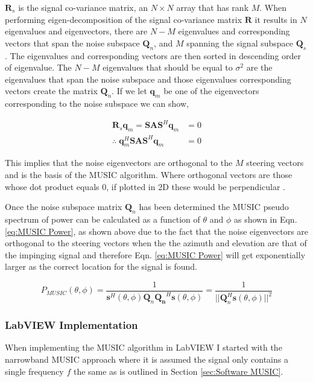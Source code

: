 \documentclass{UoNMCHA}
\numberwithin{equation}{section}
\begin{document}
    $\mathbf{R}_s$ is the signal co-variance matrix, an $N \times N$ array that has rank $M$. When performing eigen-decomposition of the signal co-variance matrix $\mathbf{R}$ it results in $N$ eigenvalues and eigenvectors, there are $N - M$ eigenvalues and corresponding vectors that span the noise subspace $\mathbf{Q}_n$, and $M$ spanning the signal subspace $\mathbf{Q}_s$.
    The eigenvalues and corresponding vectors are then sorted in descending order of eigenvalue. The $N-M$ eigenvalues that should be equal to $\sigma^2$ are the eigenvalues that span the noise subspace and those eigenvalues corresponding vectors create the matrix $\mathbf{Q}_n$. If we let $\mathbf{q}_m$ be one of the eigenvectors corresponding to the noise subspace we can show,
    
    \begin{equation}
    \begin{split}
        \mathbf{R}_s\mathbf{q}_m = \mathbf{SAS}^H\mathbf{q}_m & = 0\\
        \therefore \; \mathbf{q}_m^H\mathbf{SAS}^H\mathbf{q}_m & = 0
    \end{split}
    \end{equation}

    This implies that the noise eigenvectors are orthogonal to the $M$ steering vectors and is the basis of the MUSIC algorithm. Where orthogonal vectors are those whose dot product equals $0$, if plotted in 2D these would be perpendicular \citep{Wei}.
    
    Once the noise subspace matrix $\mathbf{Q}_n$ has been determined the MUSIC pseudo spectrum of power can be calculated as a function of $\theta$ and $\phi$ as shown in Eqn. \ref{eq:MUSIC Power}, as shown above due to the fact that the noise eigenvectors are orthogonal to the steering vectors when the the azimuth and elevation are that of the impinging signal and therefore Eqn. \ref{eq:MUSIC Power} will get exponentially larger as the correct location for the signal is found.
    
    \begin{equation}
        P_{MUSIC}(\theta,\phi) = \frac{1}{\mathbf{s}^H(\theta,\phi)\mathbf{Q}_n\mathbf{Q_n}^H\mathbf{s}(\theta,\phi)} = \frac{1}{||\mathbf{Q}_n^H\mathbf{s}(\theta,\phi)||^2}
        \label{eq:MUSIC Power}
    \end{equation}

\subsubsection{LabVIEW Implementation} \label{sec:MUSIC LabVIEW}
    When implementing the MUSIC algorithm in LabVIEW I started with the narrowband MUSIC approach where it is assumed the signal only contains a single frequency $f$ the same as is outlined in Section \ref{sec:Software MUSIC}.
    
\end{document}
